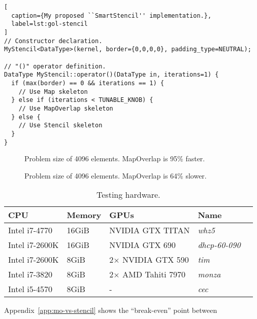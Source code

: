 \newpage
\lstset{language=C++}
\begin{lstlisting}[
  caption={My proposed ``SmartStencil'' implementation.},
  label=lst:gol-stencil
]
// Constructor declaration.
MyStencil<DataType>(kernel, border={0,0,0,0}, padding_type=NEUTRAL);

// "()" operator definition.
DataType MyStencil::operator()(DataType in, iterations=1) {
  if (max(border) == 0 && iterations == 1) {
    // Use Map skeleton
  } else if (iterations < TUNABLE_KNOB) {
    // Use MapOverlap skeleton
  } else {
    // Use Stencil skeleton
  }
}
\end{lstlisting}

\begin{figure}


\caption{Problem size of 4096 elements. MapOverlap is 95\% faster.}
\label{fig:}
\end{figure}

\begin{figure}


\caption{Problem size of 4096 elements. MapOverlap is 64\% slower.}
\label{fig:}
\end{figure}

\begin{table}
\footnotesize
\centering
\begin{tabular}{| l | l | l | l | l |}
\hline
\textbf{CPU} & \textbf{Memory} & \textbf{GPUs} & \textbf{Name}\\
\hline
Intel i7-4770 & 16GiB & NVIDIA GTX TITAN & \textit{whz5}\\
Intel i7-2600K & 16GiB & NVIDIA GTX 690 & \textit{dhcp-60-090}\\
Intel i7-2600K & 8GiB & 2$\times$ NVIDIA GTX 590 & \textit{tim}\\
Intel i7-3820 & 8GiB & 2$\times$ AMD Tahiti 7970 & \textit{monza}\\
Intel i5-4570 & 8GiB & - & \textit{cec}\\
\hline
\end{tabular}
\caption{%
  Testing hardware.%
}
\label{tab:hw}
\end{table}

Appendix~\ref{app:mo-vs-stencil} shows the ``break-even'' point
between

